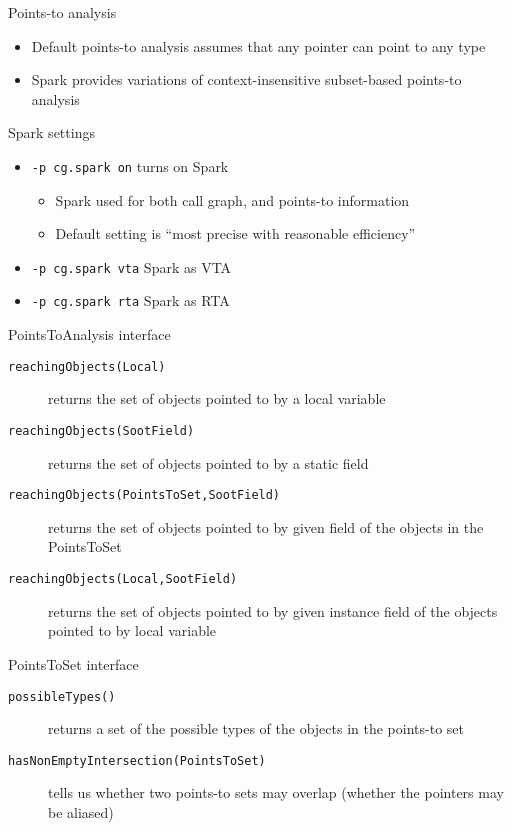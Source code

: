 \begin{slide}{Points-to analysis}
\begin{itemize}
\item Default points-to analysis assumes that any pointer can point to any type
\item Spark provides variations of context-insensitive subset-based
points-to analysis
\end{itemize}
\end{slide}

\begin{slide}{Spark settings}
\begin{itemize}
\item \texttt{-p cg.spark on} turns on Spark
\begin{itemize}
\item Spark used for both call graph, and points-to information
\item Default setting is ``most precise with reasonable efficiency''
\end{itemize}
\item \texttt{-p cg.spark vta} Spark as VTA
\item \texttt{-p cg.spark rta} Spark as RTA
\end{itemize}
\end{slide}

\begin{slide}{PointsToAnalysis interface}
\begin{description}
\item
[\texttt{\small reachingObjects(Local)}]
returns the set of objects pointed to by a local variable

\item
[\texttt{\small reachingObjects(SootField)}]
returns the set of objects pointed to by a static field

\item
[\texttt{\small reachingObjects(PointsToSet,SootField)}]
returns the set of objects pointed to by given field
of the objects in the PointsToSet

\item
[\texttt{\small reachingObjects(Local,SootField)}]
returns the set of objects pointed to by given instance field
of the objects pointed to by local variable
\end{description}
\end{slide}

\begin{slide}{PointsToSet interface}
\begin{description}
\item [\texttt{\small possibleTypes()}] returns a set of the possible types of the
objects in the points-to set
\item [\texttt{\small hasNonEmptyIntersection(PointsToSet)}] tells us whether
two points-to sets may overlap (whether the pointers may be aliased)
\end{description}
\end{slide}

